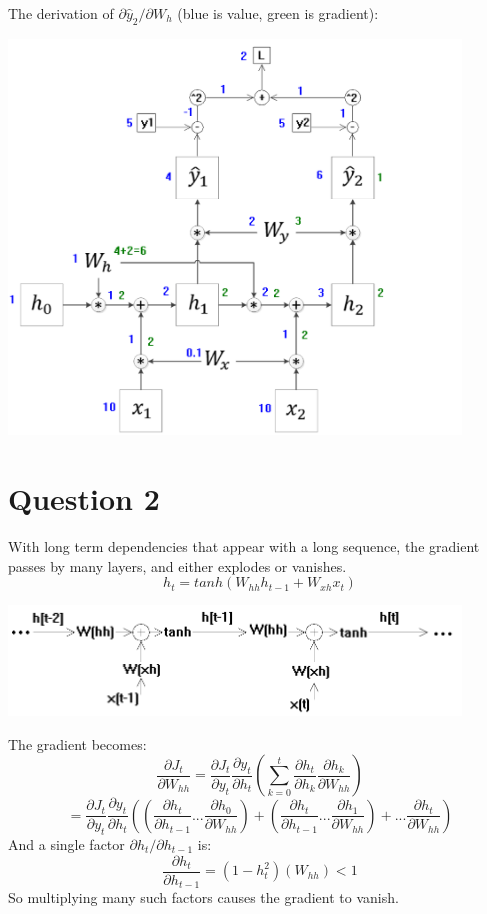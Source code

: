 \documentclass[10pt]{article}
\begin{document}
The derivation of $\partial\hat y_2/\partial W_h$ (blue is value, green is gradient):
\begin{center}
\includegraphics[width=0.9\textwidth]{20220524 Q1 attempt3b.PNG}
\end{center}


\section{Question 2}
With long term dependencies that appear with a long sequence, the gradient passes by many layers, and either explodes or vanishes.
\[	h_t=tanh(W_{hh}h_{t-1}+W_{xh}x_t)\]
\begin{center}
\includegraphics[width=0.9\textwidth]{20220525 1 Q2.PNG}
\end{center}
The gradient becomes:
\[
	\frac{\partial J_t}{\partial W_{hh}}
	=
	\frac{\partial J_t}{\partial y_t}
	\frac{\partial y_t}{\partial h_t}
	\left(
		\sum_{k=0}^t
		\frac{\partial h_t}{\partial h_k}
		\frac{\partial h_k}{\partial W_{hh}}
	\right)
\]
\[
	=
	\frac{\partial J_t}{\partial y_t}
	\frac{\partial y_t}{\partial h_t}
	\left(
		\left(\frac{\partial h_t}{\partial h_{t-1}}...\frac{\partial h_0}{\partial W_{hh}}\right)
		+
		\left(\frac{\partial h_t}{\partial h_{t-1}}...\frac{\partial h_1}{\partial W_{hh}}\right)
		+...
		\frac{\partial h_t}{\partial W_{hh}}
	\right)
\]
And a single factor $\partial h_t/\partial h_{t-1}$ is:
\[
	\frac{\partial h_t}{\partial h_{t-1}}
	=(1-h_t^2)(W_{hh})<1
\]
So multiplying many such factors causes the gradient to vanish.
\end{document}
